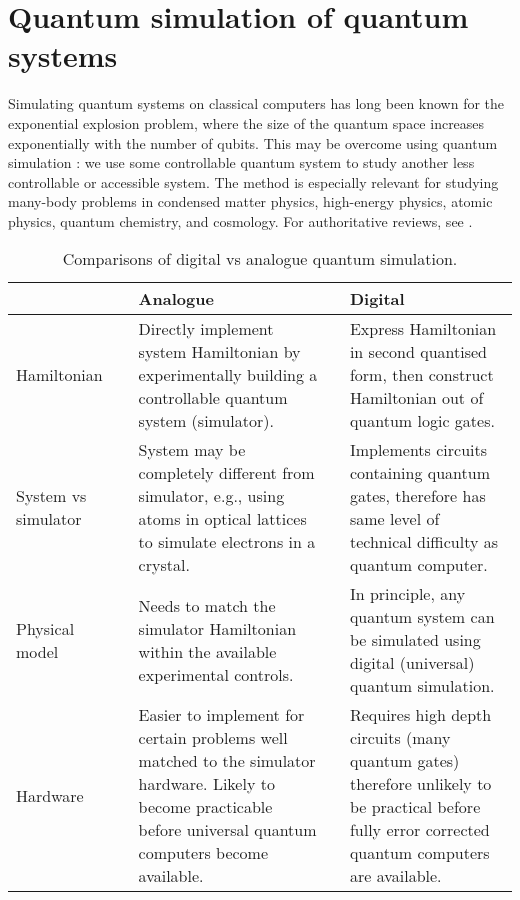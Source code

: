 \documentclass[10pt]{iopart}
\begin{document}

\section{Quantum simulation of quantum systems}\label{sec:qsim}

Simulating quantum systems on classical computers has long been known for the exponential explosion problem, where the size of the quantum space increases exponentially with the number of qubits. This may be overcome using quantum simulation \cite{Feynman1982}: we use some controllable quantum system to study another less controllable or accessible system. The method is especially relevant for studying many-body problems \cite{Weimer2021} in condensed matter physics, high-energy physics, atomic physics, quantum chemistry, and cosmology. For authoritative reviews, see \cite{Georgescu2014,Altman2021,Daley2022}.

\begin{table*}[ht!]
\centering
\caption{Comparisons of digital vs analogue quantum simulation.}
\bgroup
\def\arraystretch{1.5}
\begin{tabular}{p{.8in}p{.1in}p{2.4in}p{.1in}p{2.4in}}
&&\textbf{Analogue} && \textbf{Digital} \\
\hline
Hamiltonian
 && 
Directly implement system Hamiltonian by experimentally building a controllable quantum system (simulator).
 &&  
Express Hamiltonian in second quantised form, then construct Hamiltonian out of quantum logic gates. 
 \\
System vs simulator
 && 
System may be completely different from simulator, e.g., using atoms in optical lattices to simulate electrons in a crystal.
 &&  
Implements circuits containing quantum gates, therefore has same level of technical difficulty as quantum computer.
 \\
Physical model
 && 
Needs to match the simulator Hamiltonian within the available experimental controls.
 && 
In principle, any quantum system can be simulated using digital (universal) quantum simulation.
 \\
Hardware
 && 
Easier to implement for certain problems well matched to the simulator hardware. Likely to become practicable before universal quantum computers become available.
 &&  
Requires high depth circuits (many quantum gates) therefore unlikely to be practical before fully error corrected quantum computers are available.
 \\
 \hline
\end{tabular}
\egroup
\label{tab:quantumsim}
\end{table*}
\end{document}
